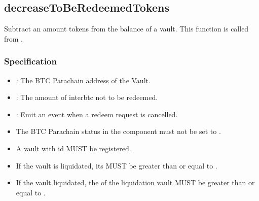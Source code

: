 \documentclass[a4paper,10pt,english]{sphinxmanual}
\begin{document}
\subsection{decreaseToBeRedeemedTokens}
\label{\detokenize{spec/vault-registry:decreasetoberedeemedtokens}}\label{\detokenize{spec/vault-registry:id21}}
Subtract an amount tokens from the  balance of a vault. This function is called from {\hyperref[\detokenize{spec/redeem:cancelredeem}]{}}.


\subsubsection{Specification}
\label{\detokenize{spec/vault-registry:id22}}


\begin{itemize}
\item {} 
: The BTC Parachain address of the Vault.

\item {} 
: The amount of interbtc not to be redeemed.

\end{itemize}

\begin{itemize}
\item {} 
: Emit an event when a redeem request is cancelled.

\end{itemize}

\begin{itemize}
\item {} 
The BTC Parachain status in the {\hyperref[\detokenize{spec/security:security}]{}} component must not be set to .

\item {} 
A vault with id  MUST be registered.

\item {} 
If the vault is  liquidated, its  MUST be greater than or equal to .

\item {} 
If the vault  liquidated, the  of the liquidation vault MUST be greater than or equal to .

\end{itemize}
\end{document}
